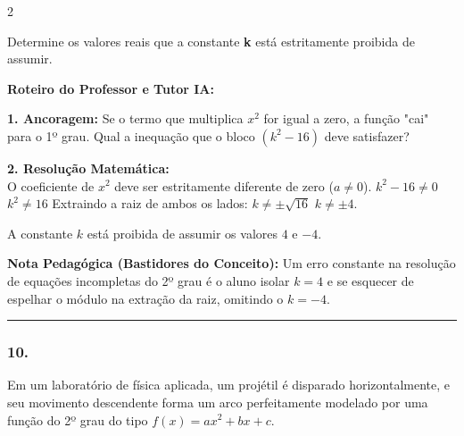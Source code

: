 \begin{multicols*}{2}
\begin{enunciadoLiteral}
Determine os valores reais que a constante \textbf{k} está estritamente proibida de assumir. 
\end{enunciadoLiteral}

\ifgabarito
    \begin{tcolorbox}[colback=CorTitUm!5, colframe=CorTitUm, boxrule=1pt, arc=4pt, left=6pt, right=6pt, top=6pt, bottom=6pt]
    \small\textbf{\textcolor{CorTitUm}{Roteiro do Professor e Tutor IA:}}\par\vspace{0.1cm}
    \color{CinzaEscuro}
    \textbf{1. Ancoragem:} Se o termo que multiplica $x^2$ for igual a zero, a função "cai" para o 1º grau. Qual a inequação que o bloco $(k^2 - 16)$ deve satisfazer?\par\vspace{0.1cm}
    \textbf{2. Resolução Matemática:}\\
    O coeficiente de $x^2$ deve ser estritamente diferente de zero ($a \neq 0$).
    $k^2 - 16 \neq 0$
    $k^2 \neq 16$
    Extraindo a raiz de ambos os lados:
    $k \neq \pm \sqrt{16}$
    $k \neq \pm 4$.
    
    A constante $k$ está proibida de assumir os valores $4$ e $-4$.
    \end{tcolorbox}
    \vspace{0.15cm}
    
    \begin{boxexplicacao}
    \textbf{Nota Pedagógica (Bastidores do Conceito):} Um erro constante na resolução de equações incompletas do 2º grau é o aluno isolar $k = 4$ e se esquecer de espelhar o módulo na extração da raiz, omitindo o $k = -4$.
    \end{boxexplicacao}
\fi

\par\vspace{\espacoQuestao}

\noindent\textcolor{CorLinha}{\rule{\linewidth}{0.5pt}} 
\par\vspace{\espacoPreQuestao}
\subsubsection*{10.} 
\begin{enunciadoLiteral}
Em um laboratório de física aplicada, um projétil é disparado horizontalmente, e seu movimento descendente forma um arco perfeitamente modelado por uma função do 2º grau do tipo $f(x) = ax^2 + bx + c$.


\end{enunciadoLiteral}
\end{multicols*}
